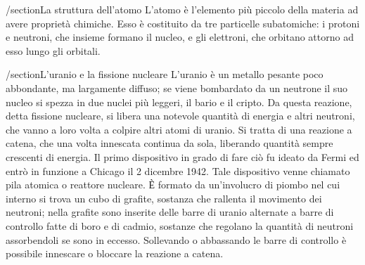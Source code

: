 /section{La struttura dell'atomo}
L'atomo  è l'elemento più piccolo della materia ad avere proprietà chimiche. Esso è costituito da tre particelle subatomiche: i protoni e neutroni, che insieme formano il nucleo, e gli elettroni, che orbitano attorno ad esso lungo gli orbitali.

/section{L'uranio e la fissione nucleare}
L'uranio è un metallo pesante poco abbondante, ma largamente diffuso; se viene bombardato da un neutrone il suo nucleo si spezza in due nuclei più leggeri, il bario e il cripto. Da questa reazione, detta fissione nucleare, si libera una notevole quantità di energia e altri neutroni, che vanno a loro volta a colpire altri atomi di uranio. Si tratta di una reazione a catena, che una volta innescata continua da sola, liberando quantità sempre crescenti di energia.
Il primo dispositivo in grado di fare ciò fu ideato da Fermi ed entrò in funzione a Chicago il 2 dicembre 1942. Tale dispositivo venne chiamato pila atomica o reattore nucleare. Ѐ formato da un'involucro di piombo nel cui interno si trova un cubo di grafite, sostanza che rallenta il movimento dei neutroni; nella grafite sono inserite delle barre di uranio alternate a barre di controllo fatte di boro e di cadmio, sostanze che regolano la quantità di neutroni assorbendoli se sono in eccesso. Sollevando o abbassando le barre di controllo è possibile innescare o bloccare la reazione a catena.
